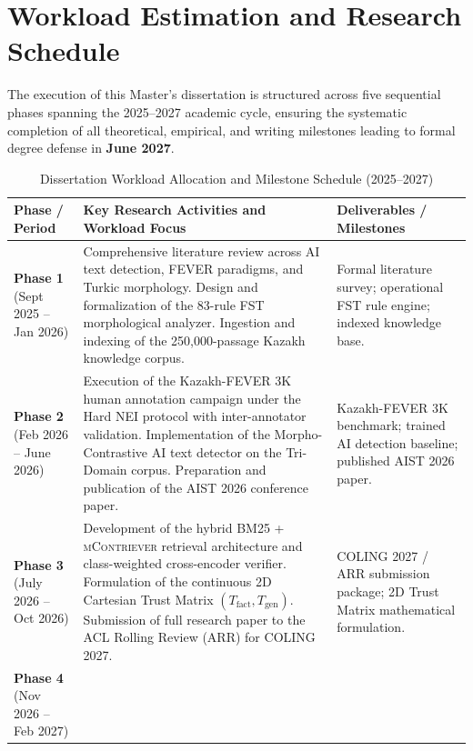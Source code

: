 \section{Workload Estimation and Research Schedule}
\label{sec:timeline}

The execution of this Master's dissertation is structured across five sequential phases spanning the 2025--2027 academic cycle, ensuring the systematic completion of all theoretical, empirical, and writing milestones leading to formal degree defense in \textbf{June 2027}.

\begin{table}[t]
\centering
\small
\renewcommand{\arraystretch}{1.3}
\caption{Dissertation Workload Allocation and Milestone Schedule (2025--2027)}
\label{tab:schedule}
\begin{tabularx}{\textwidth}{|p{}|X|p{}|}
\hline
\textbf{Phase / Period} & \textbf{Key Research Activities and Workload Focus} & \textbf{Deliverables / Milestones} \\
\hline
\textbf{Phase 1} \newline (Sept 2025 -- Jan 2026) & 
Comprehensive literature review across AI text detection, FEVER paradigms, and Turkic morphology. Design and formalization of the 83-rule FST morphological analyzer. Ingestion and indexing of the 250,000-passage Kazakh knowledge corpus. & 
Formal literature survey; operational FST rule engine; indexed knowledge base. \\
\hline
\textbf{Phase 2} \newline (Feb 2026 -- June 2026) & 
Execution of the Kazakh-FEVER 3K human annotation campaign under the Hard NEI protocol with inter-annotator validation. Implementation of the Morpho-Contrastive AI text detector on the Tri-Domain corpus. Preparation and publication of the AIST 2026 conference paper. & 
Kazakh-FEVER 3K benchmark; trained AI detection baseline; published AIST 2026 paper. \\
\hline
\textbf{Phase 3} \newline (July 2026 -- Oct 2026) & 
Development of the hybrid BM25 + \textsc{mContriever} retrieval architecture and class-weighted cross-encoder verifier. Formulation of the continuous 2D Cartesian Trust Matrix $(T_{\text{fact}}, T_{\text{gen}})$. Submission of full research paper to the ACL Rolling Review (ARR) for COLING 2027. & 
COLING 2027 / ARR submission package; 2D Trust Matrix mathematical formulation. \\
\hline
\textbf{Phase 4} \newline (Nov 2026 -- Feb 2027) & 

\end{tabularx}
\end{table}
